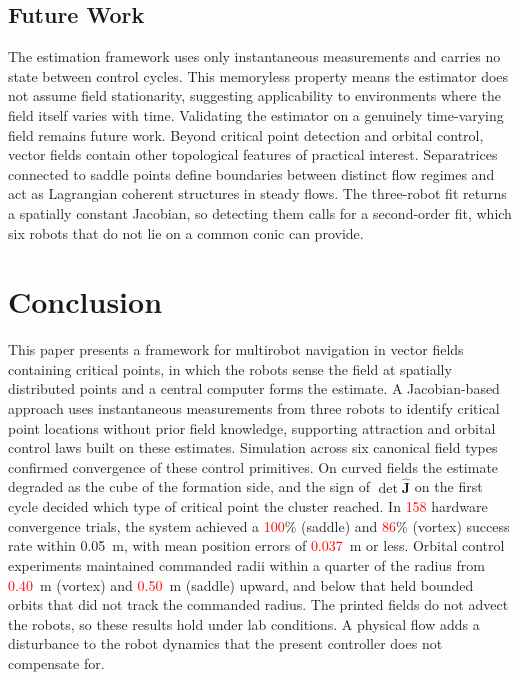 \documentclass[lettersize,journal]{IEEEtran}
\newcommand{\syn}[1]{\textcolor{red}{#1}}            %
\begin{document}
\subsection{Future Work}

The estimation framework uses only instantaneous measurements and carries no state between control cycles. This memoryless property means the estimator does not assume field stationarity, suggesting applicability to environments where the field itself varies with time. Validating the estimator on a genuinely time-varying field remains future work. Beyond critical point detection and orbital control, vector fields contain other topological features of practical interest. Separatrices connected to saddle points define boundaries between distinct flow regimes and act as Lagrangian coherent structures in steady flows. The three-robot fit returns a spatially constant Jacobian, so detecting them calls for a second-order fit, which six robots that do not lie on a common conic can provide.



\section{Conclusion}
\noindent

This paper presents a framework for multirobot navigation in vector fields containing critical points, in which the robots sense the field at spatially distributed points and a central computer forms the estimate. A Jacobian-based approach uses instantaneous measurements from three robots to identify critical point locations without prior field knowledge, supporting attraction and orbital control laws built on these estimates. Simulation across six canonical field types confirmed convergence of these control primitives. On curved fields the estimate degraded as the cube of the formation side, and the sign of $\det\hat{\mathbf{J}}$ on the first cycle decided which type of critical point the cluster reached. In \syn{158} hardware convergence trials, the system achieved a \syn{100}\% (saddle) and \syn{86}\% (vortex) success rate within 0.05~m, with mean position errors of \syn{0.037}~m or less. Orbital control experiments maintained commanded radii within a quarter of the radius from \syn{0.40}~m (vortex) and \syn{0.50}~m (saddle) upward, and below that held bounded orbits that did not track the commanded radius. %
The printed fields do not advect the robots, so these results hold under lab conditions. A physical flow adds a disturbance to the robot dynamics that the present controller does not compensate for.
\end{document}
